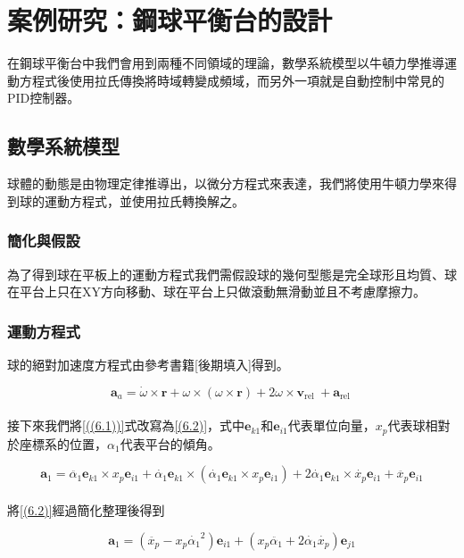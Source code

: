 \chapter{案例研究：鋼球平衡台的設計}
在鋼球平衡台中我們會用到兩種不同領域的理論，數學系統模型以牛頓力學推導運動方程式後使用拉氏傳換將時域轉變成頻域，而另外一項就是自動控制中常見的PID控制器。

\section{數學系統模型}
球體的動態是由物理定律推導出，以微分方程式來表達，我們將使用牛頓力學來得到球的運動方程式，並使用拉氏轉換解之。

\subsection{簡化與假設}
為了得到球在平板上的運動方程式我們需假設球的幾何型態是完全球形且均質、球在平台上只在XY方向移動、球在平台上只做滾動無滑動並且不考慮摩擦力。

\subsection{運動方程式}
球的絕對加速度方程式由參考書籍[後期填入]得到。

\begin{equation}
\mathbf{a}_a=\dot{\omega} \times \mathbf{r}+\omega \times(\omega \times \mathbf{r})+2 \omega \times \mathbf{v}_{\text {rel }}+\mathbf{a}_{\text {rel }}
\label{((6.1))}
\end{equation} \\

接下來我們將\ref{((6.1))}式改寫為\ref{(6.2)}，式中\(\mathbf{e}_{k1}\)和\(\mathbf{e}_{i1}\)代表單位向量，\(x_p\)代表球相對於座標系的位置，\(\alpha_1\)代表平台的傾角。

\begin{equation}
\mathbf{a}_1=\ddot{\alpha_1} \mathbf{e}_{k1} \times x_p \mathbf{e}_{i1}+\dot{\alpha_1} \mathbf{e}_{k1} \times\left(\dot{\alpha_1} \mathbf{e}_{k1} \times x_p \mathbf{e}_{i1}\right)+2 \dot{\alpha_1} \mathbf{e}_{k1} \times \dot{x_p} \mathbf{e}_{i1}+\ddot{x_p} \mathbf{e}_{i1}
\label{(6.2)}
\end{equation} \\

將\ref{(6.2)}經過簡化整理後得到

\begin{equation}
\mathbf{a}_1= \left( \ddot{x_p} - x_p \dot{\alpha_1}^2 \right) \mathbf{e}_{i1} + \left( x_p \ddot{\alpha_1} + 2 \dot{\alpha_1} \dot{x_p} \right) \mathbf{e}_{j1}
\label{(6.3)}
\end{equation}\\

